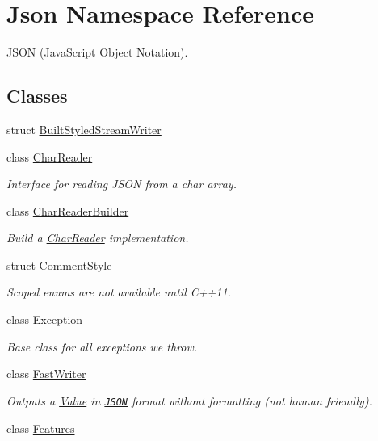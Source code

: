 \hypertarget{namespaceJson}{}\section{Json Namespace Reference}
\label{namespaceJson}


J\+S\+ON (Java\+Script Object Notation).  


\subsection*{Classes}
\begin{DoxyCompactItemize}
\item 
struct \hyperlink{structJson_1_1BuiltStyledStreamWriter}{Built\+Styled\+Stream\+Writer}
\item 
class \hyperlink{classJson_1_1CharReader}{Char\+Reader}
\begin{DoxyCompactList}\small\item\em Interface for reading J\+S\+ON from a char array. \end{DoxyCompactList}\item 
class \hyperlink{classJson_1_1CharReaderBuilder}{Char\+Reader\+Builder}
\begin{DoxyCompactList}\small\item\em Build a \hyperlink{classJson_1_1CharReader}{Char\+Reader} implementation. \end{DoxyCompactList}\item 
struct \hyperlink{structJson_1_1CommentStyle}{Comment\+Style}
\begin{DoxyCompactList}\small\item\em Scoped enums are not available until C++11. \end{DoxyCompactList}\item 
class \hyperlink{classJson_1_1Exception}{Exception}
\begin{DoxyCompactList}\small\item\em Base class for all exceptions we throw. \end{DoxyCompactList}\item 
class \hyperlink{classJson_1_1FastWriter}{Fast\+Writer}
\begin{DoxyCompactList}\small\item\em Outputs a \hyperlink{classJson_1_1Value}{Value} in \href{http://www.json.org}{\tt J\+S\+ON} format without formatting (not human friendly). \end{DoxyCompactList}\item 
class \hyperlink{classJson_1_1Features}{Features}

\end{DoxyCompactItemize}
